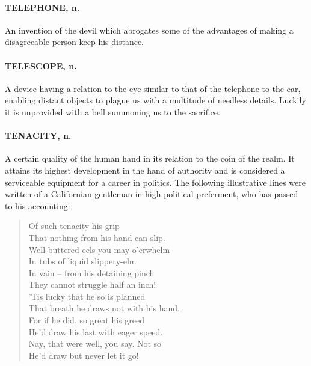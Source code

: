 \documentclass[11pt]{article}
\begin{document}
\paragraph{TELEPHONE, n.}  An invention of the devil which abrogates some of the
advantages of making a disagreeable person keep his distance.

\paragraph{TELESCOPE, n.}  A device having a relation to the eye similar to that
of the telephone to the ear, enabling distant objects to plague us
with a multitude of needless details.  Luckily it is unprovided with a
bell summoning us to the sacrifice.

\paragraph{TENACITY, n.}  A certain quality of the human hand in its relation to
the coin of the realm.  It attains its highest development in the hand
of authority and is considered a serviceable equipment for a career in
politics.  The following illustrative lines were written of a
Californian gentleman in high political preferment, who has passed to
his accounting:

\begin{quote}   Of such tenacity his grip \\
  That nothing from his hand can slip. \\
  Well-buttered eels you may o'erwhelm \\
  In tubs of liquid slippery-elm \\
  In vain -- from his detaining pinch \\
  They cannot struggle half an inch! \\
  'Tis lucky that he so is planned \\
  That breath he draws not with his hand, \\
  For if he did, so great his greed \\
  He'd draw his last with eager speed. \\
  Nay, that were well, you say.  Not so \\
  He'd draw but never let it go!  \end{quote}
\end{document}
